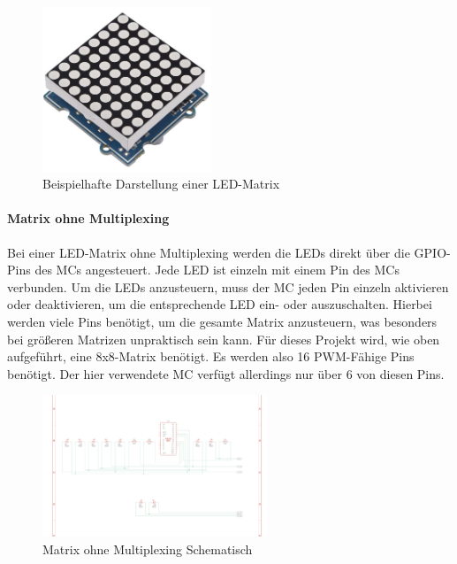 \begin{figure}[htbp] %
	\centering
	\includegraphics[width=0.45\textwidth]{img/LED-Matrix}
	\caption{Beispielhafte Darstellung einer LED-Matrix}
	\label{img:LED-Matrix}
\end{figure}

\paragraph{Matrix ohne Multiplexing}

Bei einer LED-Matrix ohne Multiplexing werden die LEDs direkt über die \ac{GPIO}-Pins des
\ac{MC}s angesteuert. Jede LED ist einzeln mit einem Pin des \ac{MC}s verbunden. Um die LEDs anzusteuern,
muss der \ac{MC} jeden Pin einzeln aktivieren oder deaktivieren, um die entsprechende LED ein- oder auszuschalten.
Hierbei werden viele Pins benötigt, um die gesamte Matrix anzusteuern, was besonders bei größeren Matrizen unpraktisch
sein kann. Für dieses Projekt wird, wie oben aufgeführt, eine 8x8-Matrix benötigt. Es werden also 16 PWM-Fähige Pins
benötigt. Der hier verwendete \ac{MC} verfügt allerdings nur über 6 von diesen Pins.

\begin{figure}[htbp]
	\centering
	\includegraphics[width=0.6\textwidth]{img/LEDMatrixSchaltung}
	\caption{Matrix ohne Multiplexing Schematisch}
	\label{fig:Matrix}
\end{figure}

